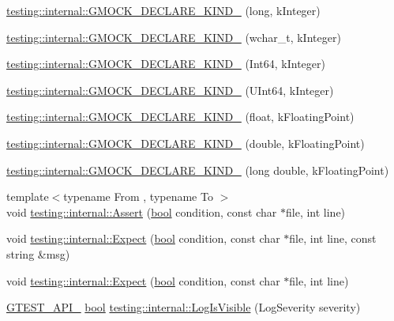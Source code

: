 \begin{DoxyCompactItemize}
\item 
\hyperlink{namespacetesting_1_1internal_a40597f856b3d94dc82e9fbbf9b027819}{testing\+::internal\+::\+G\+M\+O\+C\+K\+\_\+\+D\+E\+C\+L\+A\+R\+E\+\_\+\+K\+I\+N\+D\+\_\+} (long, k\+Integer)
\item 
\hyperlink{namespacetesting_1_1internal_af00aa2679c10ed170064e5ec5dd80e29}{testing\+::internal\+::\+G\+M\+O\+C\+K\+\_\+\+D\+E\+C\+L\+A\+R\+E\+\_\+\+K\+I\+N\+D\+\_\+} (wchar\+\_\+t, k\+Integer)
\item 
\hyperlink{namespacetesting_1_1internal_ae1d4cd9aef9a240d257364691ed3679e}{testing\+::internal\+::\+G\+M\+O\+C\+K\+\_\+\+D\+E\+C\+L\+A\+R\+E\+\_\+\+K\+I\+N\+D\+\_\+} (Int64, k\+Integer)
\item 
\hyperlink{namespacetesting_1_1internal_ae09394c3d07a5d99308fc3bbc9edc877}{testing\+::internal\+::\+G\+M\+O\+C\+K\+\_\+\+D\+E\+C\+L\+A\+R\+E\+\_\+\+K\+I\+N\+D\+\_\+} (U\+Int64, k\+Integer)
\item 
\hyperlink{namespacetesting_1_1internal_ad4ebf1b53b79ac38fbd18ccf4d63ceca}{testing\+::internal\+::\+G\+M\+O\+C\+K\+\_\+\+D\+E\+C\+L\+A\+R\+E\+\_\+\+K\+I\+N\+D\+\_\+} (float, k\+Floating\+Point)
\item 
\hyperlink{namespacetesting_1_1internal_a45748f4c08b868cb4939081769cdc7b1}{testing\+::internal\+::\+G\+M\+O\+C\+K\+\_\+\+D\+E\+C\+L\+A\+R\+E\+\_\+\+K\+I\+N\+D\+\_\+} (double, k\+Floating\+Point)
\item 
\hyperlink{namespacetesting_1_1internal_af46fdd94d8aea0da729b554de443315f}{testing\+::internal\+::\+G\+M\+O\+C\+K\+\_\+\+D\+E\+C\+L\+A\+R\+E\+\_\+\+K\+I\+N\+D\+\_\+} (long double, k\+Floating\+Point)
\item 
{\footnotesize template$<$typename From , typename To $>$ }\\void \hyperlink{namespacetesting_1_1internal_a7a259643b7f2d23ce2b757728df42c99}{testing\+::internal\+::\+Assert} (\hyperlink{classbool}{bool} condition, const char $\ast$file, int line)
\item 
void \hyperlink{namespacetesting_1_1internal_ab3000fc56be000e4fa6ed7cdcfee3106}{testing\+::internal\+::\+Expect} (\hyperlink{classbool}{bool} condition, const char $\ast$file, int line, const string \&msg)
\item 
void \hyperlink{namespacetesting_1_1internal_a0dfe8a755bd02aa5ea162764b61a9d97}{testing\+::internal\+::\+Expect} (\hyperlink{classbool}{bool} condition, const char $\ast$file, int line)
\item 
\hyperlink{gtest-port_8h_aa73be6f0ba4a7456180a94904ce17790}{G\+T\+E\+S\+T\+\_\+\+A\+P\+I\+\_\+} \hyperlink{classbool}{bool} \hyperlink{namespacetesting_1_1internal_a69ffdba5ee36743e88d8f89b79e566ff}{testing\+::internal\+::\+Log\+Is\+Visible} (Log\+Severity severity)

\end{DoxyCompactItemize}
